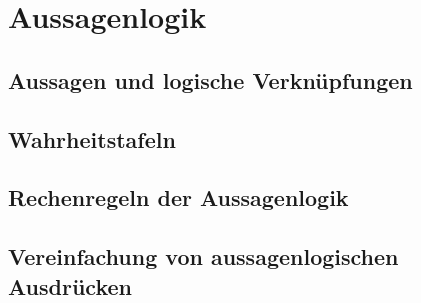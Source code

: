 \section{Aussagenlogik}

\subsection{Aussagen und logische Verknüpfungen}

\subsection{Wahrheitstafeln}

\subsection{Rechenregeln der Aussagenlogik}

\subsection{Vereinfachung von aussagenlogischen Ausdrücken}
